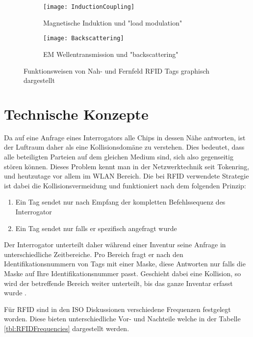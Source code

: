\begin{figure}[htb]
	\centering
	\begin{subfigure}[b]{0.8\linewidth}
		\centering
		\texttt{[image: InductionCoupling]}
		\caption{Magnetische Induktion und "load modulation"}
	\end{subfigure}
	\begin{subfigure}[b]{0.8\linewidth}
		\centering
		\texttt{[image: Backscattering]}
		\caption{EM Wellentransmission und "backscattering"}
	\end{subfigure}
	\caption{Funktionsweisen von Nah- und Fernfeld \gls{RFID} Tags graphisch dargestellt \parencite{want2006}}
\end{figure}

\section{Technische Konzepte}
\label{sec:technischeKonzepte}

Da auf eine Anfrage eines Interrogators alle Chips in dessen Nähe antworten, ist der Luft\-raum daher als eine Kollisionsdomäne zu verstehen. Dies bedeutet, dass alle beteiligten Parteien auf dem gleichen Medium sind, sich also gegenseitig stören können. Dieses Problem kennt man in der Netzwerktechnik seit Tokenring, und heutzutage vor allem im WLAN Bereich. Die bei \gls{RFID} verwendete Strategie ist dabei die Kollisionsvermeidung und funktioniert nach dem folgenden Prinzip:
\begin{enumerate}
	\item Ein Tag sendet nur nach Empfang der kompletten Befehlssequenz des Interrogator
	\item Ein Tag sendet nur falls er spezifisch angefragt wurde
\end{enumerate}
Der Interrogator unterteilt daher während einer Inventur seine Anfrage in unterschiedliche Zeitbereiche. Pro Bereich fragt er nach den Identifikationsnummern von Tags mit einer Maske, diese Antworten nur falls die Maske auf Ihre Identifikationsnummer passt. Geschieht dabei eine Kollision, so wird der betreffende Bereich weiter unterteilt, bis das ganze Inventar erfasst wurde \parencite{ISO15693-3}.

Für \gls{RFID} sind in den ISO Diskussionen verschiedene Frequenzen festgelegt worden. Diese bieten unterschiedliche Vor- und Nachteile welche in der Tabelle \ref{tbl:RFIDFrequencies} dargestellt werden.

